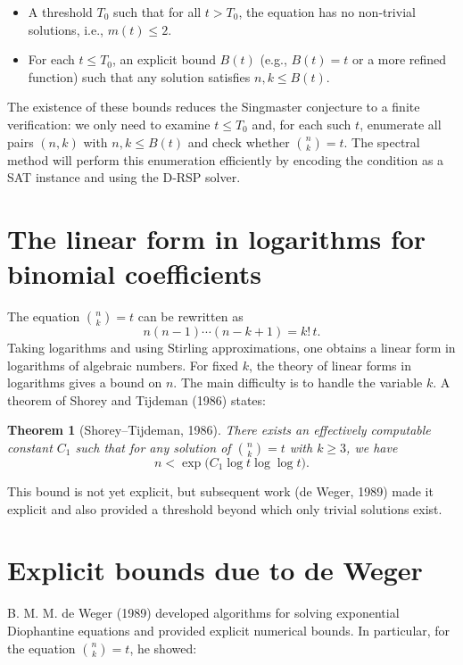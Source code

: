 \documentclass[11pt,a4paper]{article}
\newtheorem{theorem}{Theorem}[section]
\begin{document}
\begin{itemize}
\item A threshold \(T_0\) such that for all \(t > T_0\), the equation has no non‑trivial solutions, i.e., \(m(t) \le 2\).
\item For each \(t \le T_0\), an explicit bound \(B(t)\) (e.g., \(B(t)=t\) or a more refined function) such that any solution satisfies \(n,k \le B(t)\).
\end{itemize}

The existence of these bounds reduces the Singmaster conjecture to a finite verification: we only need to examine \(t \le T_0\) and, for each such \(t\), enumerate all pairs \((n,k)\) with \(n,k \le B(t)\) and check whether \(\binom{n}{k}=t\). The spectral method will perform this enumeration efficiently by encoding the condition as a SAT instance and using the D‑RSP solver.

\section{The linear form in logarithms for binomial coefficients}

The equation \(\binom{n}{k}=t\) can be rewritten as
\[
n(n-1)\cdots(n-k+1) = k!\, t.
\]
Taking logarithms and using Stirling approximations, one obtains a linear form in logarithms of algebraic numbers. For fixed \(k\), the theory of linear forms in logarithms gives a bound on \(n\). The main difficulty is to handle the variable \(k\). A theorem of Shorey and Tijdeman (1986) states:

\begin{theorem}[Shorey–Tijdeman, 1986]
\label{thm:shorey}
There exists an effectively computable constant \(C_1\) such that for any solution of \(\binom{n}{k}=t\) with \(k\ge 3\), we have
\[
n < \exp\bigl(C_1 \log t \log \log t \bigr).
\]
\end{theorem}

This bound is not yet explicit, but subsequent work (de Weger, 1989) made it explicit and also provided a threshold beyond which only trivial solutions exist.

\section{Explicit bounds due to de Weger}

B. M. M. de Weger (1989) developed algorithms for solving exponential Diophantine equations and provided explicit numerical bounds. In particular, for the equation \(\binom{n}{k}=t\), he showed:
\end{document}
